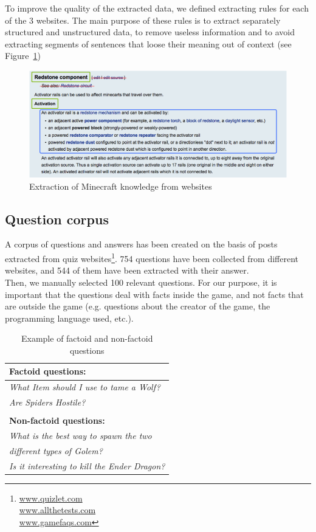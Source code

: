 \documentclass[12pt]{article}
\begin{document}
To improve the quality of the extracted data, we defined extracting rules for each of the 3 websites. The main purpose of these rules is to extract separately structured and unstructured data, to remove useless information and to avoid extracting segments of sentences that loose their meaning out of context (see Figure~\ref{extractingules})

\begin{figure}[!ht]
	\centering \includegraphics[width=\textwidth]{Figures/Knowledge/extractingRules.png}
	\caption{\label{extractingules}Extraction of Minecraft knowledge from websites}
\end{figure}

\subsection{Question corpus}
A corpus of questions and answers has been created on the basis of posts extracted from quiz websites\footnote{
\href{http://www.quizlet.com/}{www.quizlet.com} 
\\\href{http://www.allthetests.com/}{www.allthetests.com} 
\\\href{http://www.gamefaqs.com/}{www.gamefaqs.com}}. 754 questions have been collected from different websites, and 544 of them have been extracted with their answer.\\
Then, we manually selected 100 relevant questions. For our purpose, it is important that the questions deal with facts inside the game, and not facts that are outside the game (e.g. questions about the creator of the game, the programming language used, etc.).

\begin{table}[!ht]
\center
\begin{tabular}{|l|}
\hline
\textbf{Factoid questions:}\\
\hline
\textit{What Item should I use to tame a Wolf?}\\
\hline
\textit{Are Spiders Hostile?}\\
\hline
\\
\hline
\textbf{Non-factoid questions:}\\
\hline
\textit{What is the best way to spawn the two}\\
\textit{different types of Golem?}\\
\hline
\textit{Is it interesting to kill the Ender Dragon?}\\
\hline
\end{tabular}
\caption{\label{tableFactoidNonfactoid} Example of factoid and non-factoid questions}
\end{table}
\end{document}
